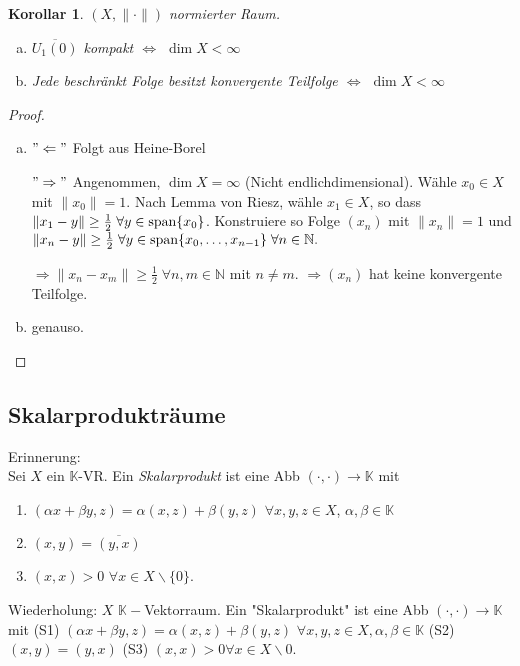 \documentclass[ngerman]{report}
\theoremstyle{plain}%
\newtheorem{cor}[thm]{Korollar}
\theoremstyle{definition}%
\theoremstyle{myStyle}
\newcommand{\N}{\mathbb{N}}
\newcommand{\K}{\mathbb{K}}
\newcommand{\aufspan}{\textnormal{span}}
\newcommand{\norm}[1]{\|#1\|}
\newcommand{\df}[1][]{%
	\overset{#1}{\Rightarrow}
}
\newcommand{\aq}{\Leftrightarrow} %
\newcommand{\qmarks}[1]{"#1"}
\newcommand{\ov}[1]{\overline{#1}}
\begin{document}
	\begin{cor}
		$(X,\norm{\cdot})$ normierter Raum.
			\begin{enumerate}[a)] 
				\item $\overline{U_1(0)}$ kompakt $\aq$ $\dim X < \infty$
				\item Jede beschränkt Folge besitzt konvergente Teilfolge $\aq$ $\dim X < \infty$
			\end{enumerate}
	\end{cor}

	\begin{proof}
		 \begin{enumerate}[a)]
			 \item $"\Leftarrow"$ Folgt aus Heine-Borel\par
				$"\Rightarrow"$ Angenommen, $\dim X = \infty$ (Nicht endlichdimensional). 
				Wähle $x_0 \in X$ mit $\norm{x_0} = 1$. Nach Lemma von Riesz, wähle $x_1 \in X$, so dass 
				$\norm{x_1 - y} \geq \frac{1}{2} \; \forall y \in \aufspan\{x_0\}$. 
				Konstruiere so Folge $(x_n)$ mit $\norm{x_n} = 1$ und $\norm{x_n - y} \geq \frac{1}{2} \; \forall y\in \aufspan\{x_0,\dots,x_{n-1}\}\; \forall n\in\N.$ \par
				$\df \norm{x_n - x_m} \geq \frac{1}{2}\; \forall n,m \in \N$  mit $n \not = m$. 
				$\df (x_n)$ hat keine konvergente Teilfolge. \par
			\item genauso.
		\end{enumerate}
	\end{proof}
	\subsection{Skalarprodukträume}
Erinnerung:\\
	Sei $X$ ein $\K$-VR. Ein \textit{Skalarprodukt} ist eine Abb $(\cdot,\cdot) \to \K$ mit 
	\begin{enumerate}[(S1)]
		\item $(\alpha x + \beta y, z) = \alpha (x,z) + \beta (y,z)$ $\forall x,y,z \in X$, $\alpha,\beta \in \K$
		\item $(x,y) = \ov{(y,x)}$
		\item $(x,x) > 0$  $\forall x\in X\backslash\{0\}$.
	\end{enumerate}

	Wiederholung: $X$ $\K-$Vektorraum. Ein \qmarks{Skalarprodukt} ist eine Abb $(\cdot,\cdot) \to \K$ mit (S1) $(\alpha x + \beta y, z) = \alpha (x,z) + \beta (y,z)$ $\forall x,y,z \in X, \alpha,\beta \in \K$
	(S2) $(x,y) = (y,x)$
	(S3) $(x,x) > 0 \forall x\in X\backslash{0}$.
\end{document}

